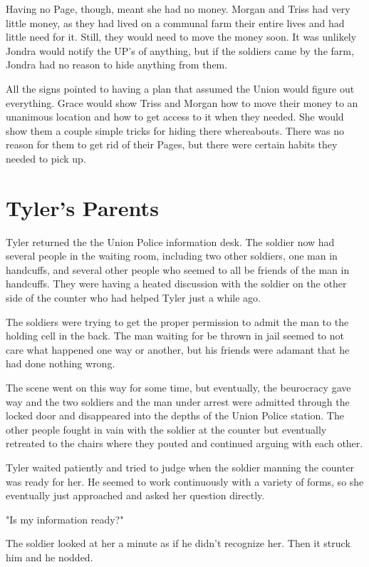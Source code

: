 \documentclass[courier]{sffms}
\begin{document}
Having no Page, though, meant she had no money.
Morgan and Triss had very little money, as they had
lived on a communal farm their entire lives and had
little need for it. Still, they would need to move the
money soon. It was unlikely Jondra would notify
the UP's of anything, but if the soldiers came by the
farm, Jondra had no reason to hide anything from them.

All the signs pointed to having a plan that assumed
the Union would figure out everything. Grace would
show Triss and Morgan how to move their money to
an unanimous location and how to get access to it
when they needed. She would show them a couple
simple tricks for hiding there whereabouts. There was
no reason for them to get rid of their Pages, but there
were certain habits they needed to pick up.

\chapter{Tyler's Parents}
Tyler returned the the Union Police information desk.
The soldier now had several people in the waiting room,
including two other soldiers, one man in handcuffs, and
several other people who seemed to all be friends of the
man in handcuffs. They were having a heated discussion
with the soldier on the other side of the counter who
had helped Tyler just a while ago.

The soldiers were trying to get the proper permission
to admit the man to the holding cell in the back. The man
waiting for be thrown in jail seemed to not care what
happened one way or another, but his friends were adamant
that he had done nothing wrong.

The scene went on this way for some time, but eventually,
the beurocracy gave way and the two soldiers and the man
under arrest were admitted through the locked door and
disappeared into the depths of the Union Police station.
The other people fought in vain with the soldier at the
counter but eventually retreated to the chairs where they
pouted and continued arguing with each other.

Tyler waited patiently and tried to judge when the soldier
manning the counter was ready for her. He seemed to
work continuously with a variety of forms, so she eventually
just approached and asked her question directly.

"Is my information ready?"

The soldier looked at her a minute as if he didn't recognize
her. Then it struck him and he nodded.
\end{document}
